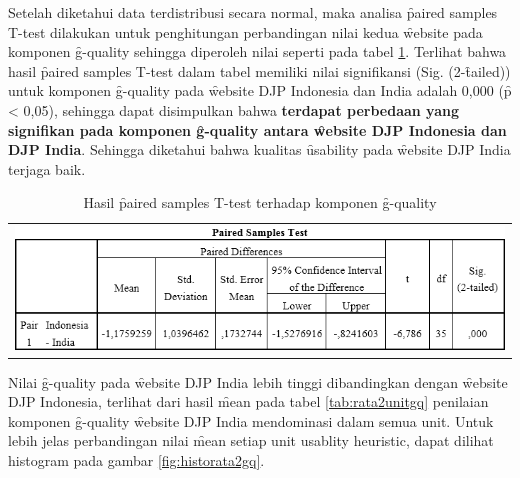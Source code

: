 \noindent
Setelah diketahui data terdistribusi secara normal, maka analisa \f{paired samples T-test} dilakukan untuk penghitungan perbandingan nilai kedua \f{website} pada komponen \f{g-quality} sehingga diperoleh nilai seperti pada tabel \ref{tab:ttestgq}. Terlihat bahwa hasil \f{paired samples T-test} dalam tabel memiliki nilai signifikansi (Sig. (2-\f{tailed})) untuk komponen \f{g-quality} pada \f{website} DJP Indonesia dan India adalah 0,000 (\f{p} < 0,05), sehingga dapat disimpulkan bahwa \textbf{terdapat perbedaan yang signifikan pada komponen \f{g-quality} antara \f{website} DJP Indonesia dan DJP India}. Sehingga diketahui bahwa kualitas \f{usability} pada \f{website} DJP India terjaga baik.
\begin{table}
	\centering
	\caption{Hasil \f{paired samples T-test} terhadap komponen \f{g-quality}}
	\label{tab:ttestgq}
	\begin{tabular}{c}
		\includegraphics[width=\textwidth]
		{pics/ordinalT-testGQ.PNG}
	\end{tabular}
\end{table}
\noindent
Nilai \f{g-quality} pada \f{website} DJP India lebih tinggi dibandingkan dengan \f{website} DJP Indonesia, terlihat dari hasil \f{mean} pada tabel \ref{tab:rata2unitgq} penilaian komponen \f{g-quality} \f{website} DJP India mendominasi dalam semua unit. Untuk lebih jelas perbandingan nilai \f{mean} setiap unit usablity heuristic, dapat dilihat histogram pada gambar \ref{fig:historata2gq}.
\begin{table}
	\centering
	\caption{Rata-rata nilai unit pada komponen \f{g-quality}}
	\label{tab:rata2unitgq}
\end{table}

